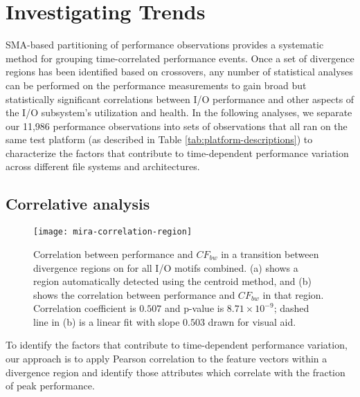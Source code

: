 \section{Investigating Trends}\label{sec:results}

SMA-based partitioning of performance observations provides a systematic method for grouping time-correlated performance events.
Once a set of divergence regions has been identified based on crossovers, any number of statistical analyses can be performed on the performance measurements to gain broad but statistically significant correlations between I/O performance and other aspects of the I/O subsystem's utilization and health.
In the following analyses, we separate our 11,986 performance observations into sets of observations that all ran on the same test platform (as described in Table \ref{tab:platform-descriptions}) to characterize the factors that contribute to time-dependent performance variation across different file systems and architectures.

\subsection{Correlative analysis} \label{sec:results/correlate-mira}

\begin{figure}
    \centering
    \texttt{[image: mira-correlation-region]}
    \vspace{-.35in}
    \caption{Correlation between performance and $CF_{bw}$ in a transition between divergence regions on \mira for all I/O motifs combined.
    (a) shows a region automatically detected using the centroid method, and (b) shows the correlation between performance and $CF_{bw}$ in that region.
    Correlation coefficient is $0.507$ and p-value is ${8.71 \times 10^{-9}}$; dashed line in (b) is a linear fit with slope $0.503$ drawn for visual aid.}
    \label{fig:mira-correlation-region}
\end{figure}


To identify the factors that contribute to time-dependent performance variation, our approach is to apply Pearson correlation to the feature vectors within a divergence region and identify those attributes which correlate with the fraction of peak performance.

